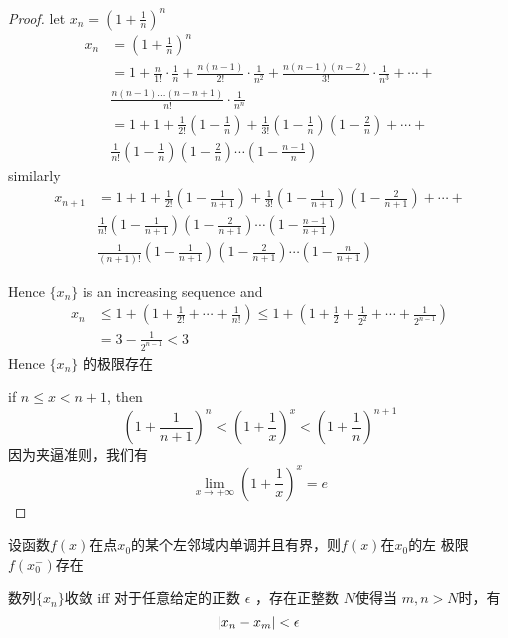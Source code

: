 \documentclass[11pt]{article}
\begin{document}
\begin{proof}
let \(x_n=(1+\frac{1}{n})^n\)
\begin{align*}
x_n&=(1+\frac{1}{n})^n\\
&=1+\frac{n}{1!}\cdot\frac{1}{n}+\frac{n(n-1)}{2!}\cdot\frac{1}{n^2}+
\frac{n(n-1)(n-2)}{3!}\cdot\frac{1}{n^3}+\cdots+\\
&\frac{n(n-1)\dots(n-n+1)}{n!}\cdot\frac{1}{n^n}\\
&=1+1+\frac{1}{2!}(1-\frac{1}{n})+\frac{1}{3!}(1-\frac{1}{n})(1-\frac{2}{n})+\cdots+\\
&\frac{1}{n!}(1-\frac{1}{n})(1-\frac{2}{n})\cdots(1-\frac{n-1}{n})
\end{align*}
similarly
\begin{align*}
x_{n+1}&=1+1+\frac{1}{2!}(1-\frac{1}{n+1})+\frac{1}{3!}(1-\frac{1}{n+1})(1-\frac{2}{n+1})+\cdots+\\
&\frac{1}{n!}(1-\frac{1}{n+1})(1-\frac{2}{n+1})\cdots(1-\frac{n-1}{n+1})\\
&\frac{1}{(n+1)!}(1-\frac{1}{n+1})(1-\frac{2}{n+1})\cdots(1-\frac{n}{n+1})
\end{align*}

Hence \(\{x_n\}\) is an increasing sequence and
\begin{align*}
x_n&\le 1+(1+\frac{1}{2!}+\cdots+\frac{1}{n!})\le 1+(1+\frac{1}{2}+\frac{1}{2^2}+\cdots+\frac{1}{2^{n-1}})\\
&=3-\frac{1}{2^{n-1}}<3
\end{align*}
Hence \(\{x_n\}\) 的极限存在

if \(n\le x<n+1\), then
\begin{equation*}
(1+\frac{1}{n+1})^n<(1+\frac{1}{x})^x<(1+\frac{1}{n})^{n+1}
\end{equation*}
因为夹逼准则，我们有
\begin{equation*}
\lim_{x\to+\infty}(1+\frac{1}{x})^x=e
\end{equation*}
\end{proof}

\begin{proposition}[准则2']
设函数\(f(x)\)在点\(x_0\)的某个左邻域内单调并且有界，则\(f(x)\)在\(x_0\)的左
极限\(f(x_0^-)\)存在
\end{proposition}

\begin{proposition}[柯西极限存在准则]
数列\(\{x_n\}\)收敛 iff 对于任意给定的正数 \(\epsilon\) ，存在正整数 \(N\)使得当
\(m,n>N\)时，有
\begin{equation*}
\abs{x_n-x_m}<\epsilon
\end{equation*}
\end{proposition}
\end{document}
